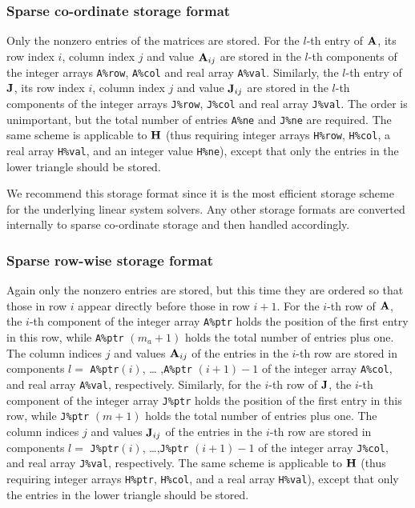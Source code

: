 \documentclass{galahad}
\begin{document}
\subsubsection{Sparse co-ordinate storage format}\label{coordinate}
Only the nonzero entries of the matrices are stored. For the $l$-th
entry of ${\mathbf{A}}$, its row index $i$, column index $j$ and value
${\mathbf{A}}_{ij}$ are stored in the $l$-th components of the integer arrays
{\tt A\%row}, {\tt A\%col} and real array {\tt A\%val}.  Similarly,
the $l$-th entry of ${\mathbf{J}}$, its row index $i$, column index $j$ and
value ${\mathbf{J}}_{ij}$ are stored in the $l$-th components of the integer
arrays {\tt J\%row}, {\tt J\%col} and real array {\tt J\%val}.  The
order is unimportant, but the total number of entries {\tt A\%ne} and
{\tt J\%ne} are required.  The same scheme is applicable to ${\mathbf{H}}$
(thus requiring integer arrays {\tt H\%row}, {\tt H\%col}, a real
array {\tt H\%val}, and an integer value {\tt H\%ne}), except that only
the entries in the lower triangle should be stored.

We recommend this storage format since it is the most efficient
storage scheme for the underlying linear system solvers.  Any other
storage formats are converted internally to sparse co-ordinate
storage and then handled accordingly.

\subsubsection{Sparse row-wise storage format}\label{rowwise}
Again only the nonzero entries are stored, but this time they are
ordered so that those in row $i$ appear directly before those in row
$i+1$. For the $i$-th row of ${\mathbf{A}}$, the $i$-th component of the integer
array {\tt A\%ptr} holds the position of the first entry in this row,
while {\tt A\%ptr} $(m_a+1)$ holds the total number of entries plus one.
The column indices $j$ and values ${\mathbf{A}}_{ij}$ of the entries in the
$i$-th row are stored in components $l =$ {\tt A\%ptr}$(i)$, \ldots
,{\tt A\%ptr} $(i+1)-1$ of the integer array {\tt A\%col}, and real
array {\tt A\%val}, respectively.  Similarly, for the $i$-th row of
${\mathbf{J}}$, the $i$-th component of the integer array {\tt J\%ptr} holds the
position of the first entry in this row, while {\tt J\%ptr} $(m+1)$
holds the total number of entries plus one.  The column indices $j$
and values ${\mathbf{J}}_{ij}$ of the entries in the $i$-th row are stored in
components $l =$ {\tt J\%ptr}$(i)$, \ldots ,{\tt J\%ptr} $(i+1)-1$ of
the integer array {\tt J\%col}, and real array {\tt J\%val},
respectively.  The same scheme is applicable to
${\mathbf{H}}$ (thus requiring integer arrays {\tt H\%ptr}, {\tt H\%col}, and 
a real array {\tt H\%val}),
except that only the entries in the lower triangle should be stored.
\end{document}
